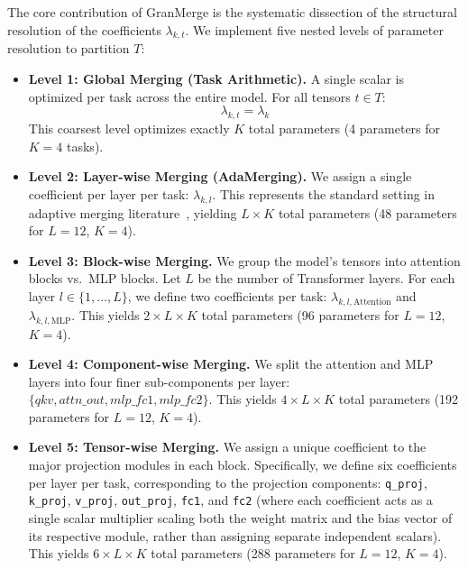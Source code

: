 The core contribution of GranMerge is the systematic dissection of the structural resolution of the coefficients $\lambda_{k, t}$. 
We implement five nested levels of parameter resolution to partition $T$:

\begin{itemize}
    \item \textbf{Level 1: Global Merging (Task Arithmetic).} A single scalar is optimized per task across the entire model. For all tensors $t \in T$:
    \begin{equation}
    \lambda_{k, t} = \lambda_k
    \end{equation}
    This coarsest level optimizes exactly $K$ total parameters (4 parameters for $K=4$ tasks).
    
    \item \textbf{Level 2: Layer-wise Merging (AdaMerging).} We assign a single coefficient per layer per task: $\lambda_{k, l}$. This represents the standard setting in adaptive merging literature~\cite{yang2024adamerging}, yielding $L \times K$ total parameters (48 parameters for $L=12$, $K=4$).
    
    \item \textbf{Level 3: Block-wise Merging.} We group the model's tensors into attention blocks vs.\ MLP blocks. Let $L$ be the number of Transformer layers. For each layer $l \in \{1, \dots, L\}$, we define two coefficients per task: $\lambda_{k, l, \text{Attention}}$ and $\lambda_{k, l, \text{MLP}}$. This yields $2 \times L \times K$ total parameters (96 parameters for $L=12$, $K=4$).
    
    \item \textbf{Level 4: Component-wise Merging.} We split the attention and MLP layers into four finer sub-components per layer: $\{qkv, attn\_out, mlp\_fc1, mlp\_fc2\}$. This yields $4 \times L \times K$ total parameters (192 parameters for $L=12$, $K=4$).
    
    \item \textbf{Level 5: Tensor-wise Merging.} We assign a unique coefficient to the major projection modules in each block. Specifically, we define six coefficients per layer per task, corresponding to the projection components: \texttt{q\_proj}, \texttt{k\_proj}, \texttt{v\_proj}, \texttt{out\_proj}, \texttt{fc1}, and \texttt{fc2} (where each coefficient acts as a single scalar multiplier scaling both the weight matrix and the bias vector of its respective module, rather than assigning separate independent scalars). This yields $6 \times L \times K$ total parameters (288 parameters for $L=12$, $K=4$).
\end{itemize}

